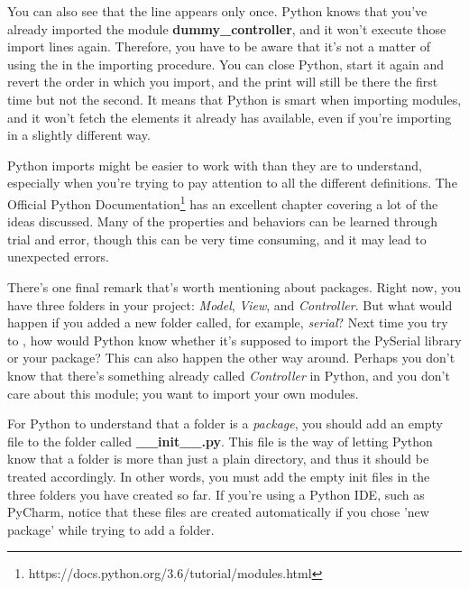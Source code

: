 \sloppy You can also see that the line  appears only once. Python knows that you've already imported the module \textbf{dummy\_controller}, and it won't execute those import lines again. Therefore, you have to be aware that it's not a matter of using the  in the importing procedure. You can close Python, start it again and revert the order in which you import, and the print will still be there the first time but not the second. It means that Python is smart when importing modules, and it won't fetch the elements it already has available, even if you're importing in a slightly different way.


Python imports might be easier to work with than they are to understand, especially when you're trying to pay attention to all the different definitions. The Official Python Documentation\footnote{https://docs.python.org/3.6/tutorial/modules.html} has an excellent chapter covering a lot of the ideas discussed. Many of the properties and behaviors can be learned through trial and error, though this can be very time consuming, and it may lead to unexpected errors.

There's one final remark that's worth mentioning about packages. Right now, you have three folders in your project: \emph{Model}, \emph{View}, and \emph{Controller}. But what would happen if you added a new folder called, for example, \emph{serial}? Next time you try to , how would Python know whether it's supposed to import the PySerial library or your package? This can also happen the other way around. Perhaps you don't know that there's something already called \emph{Controller} in Python, and you don't care about this module; you want to import your own modules.

For Python to understand that a folder is a \emph{package}, you should add an empty file to the folder called \textbf{\_\_init\_\_.py}. This file is the way of letting Python know that a folder is more than just a plain directory, and thus it should be treated accordingly. In other words, you must add the empty init files in the three folders you have created so far. If you're using a Python IDE, such as PyCharm, notice that these files are created automatically if you chose 'new package' while trying to add a folder.

